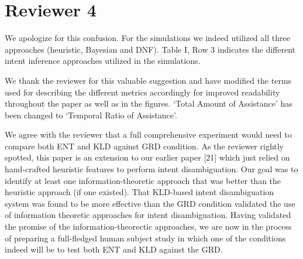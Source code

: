 \documentclass[a4paper,twoside,11pt]{reviewresponse}
\begin{document}
%
\clearpage

\section{Reviewer 4}


We apologize for this confusion. For the simulations we indeed utilized all three approaches (heuristic, Bayesian and DNF). Table I, Row 3 indicates the different intent inference approaches utilized in the simulations. 


We thank the reviewer for this valuable suggestion and have modified the terms used for describing the different metrics accordingly for improved readability throughout the paper as well as in the figures. `Total Amount of Assistance' has been changed to `Temporal Ratio of Assistance'. 


We agree with the reviewer that a full comprehensive experiment would need to compare both ENT and KLD against GRD condition. As the reviewer rightly spotted, this paper is an extension to our earlier paper [21] which just relied on hand-crafted heuristic features to perform intent disambiguation. 
Our goal was to identify at least one 
information-theoretic approach that was better than the heuristic 
approach (if one existed). That KLD-based intent disambiguation system 
was found to be more effective than the GRD condition validated the use 
of information theoretic approaches for intent disambiguation. Having 
validated the promise of the information-theorectic approaches, we are 
now in the process of preparing a full-fledged human subject study in 
which one of the conditions indeed will be to test both ENT and KLD 
against the GRD.
\end{document}
